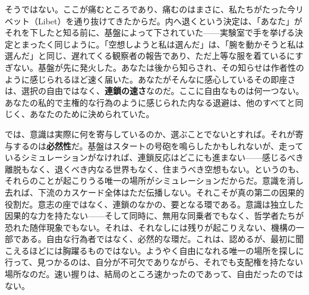 \documentclass[11pt, twoside, openright]{book}
\begin{document}
そうではない。ここが痛むところであり、痛むのはまさに、私たちがたった今リベット（Libet）を通り抜けてきたからだ。内へ退くという決定は、「あなた」がそれを下したと知る前に、基盤によって下されていた------実験室で手を挙げる決定とまったく同じように。「空想しようと私は選んだ」は、「腕を動かそうと私は選んだ」と同じ、遅れてくる観察者の報告であり、ただ上等な服を着ているにすぎない。基盤が先に発火した。あなたは後から知らされ、その知らせは作者性のように感じられるほど速く届いた。あなたがそんなに感心しているその即座さは、選択の自由ではなく、\textbf{連鎖の速さ}なのだ。ここに自由なものは何一つない。あなたの私的で主権的な行為のように感じられた内なる退避は、他のすべてと同じく、あなたのために決められていた。

では、意識は実際に何を寄与しているのか、選ぶことでないとすれば。それが寄与するのは\textbf{必然性}だ。基盤はスタートの号砲を鳴らしたかもしれないが、走っているシミュレーションがなければ、連鎖反応はどこにも進まない------感じるべき離脱もなく、退くべき内なる世界もなく、住まうべき空想もない。というのも、それらのことが起こりうる唯一の場所がシミュレーションだからだ。意識を消し去れば、下流のカスケード全体はただ伝播しない。それこそが真の第二の因果的役割だ。意志の座ではなく、連鎖のなかの、要となる環である。意識は独立した因果的な力を持たない------そして同時に、無用な同乗者でもなく、哲学者たちが恐れた随伴現象でもない。それは、それなしには残りが起こりえない、機構の一部である。自由な行為者ではなく、必然的な環だ。これは、認めるが、最初に聞こえるほどには胸躍るものではない。ようやく自由になれる唯一の場所を探しに行って、見つかるのは、自分が不可欠でありながら、それでも支配権を持たない場所なのだ。速い握りは、結局のところ速かったのであって、自由だったのではない。
\end{document}
